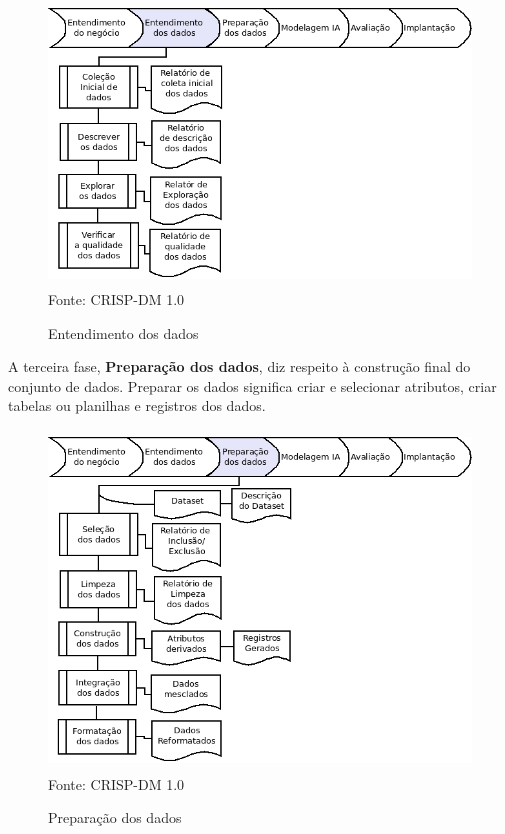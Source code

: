 \begin{figure}[!ht]
\centering
\caption{Entendimento dos dados}
\vspace{1mm}
\includegraphics[width=120mm, height=75mm]{Figuras/Cronograma/EntendDados.png}\\
\tiny Fonte: CRISP-DM 1.0
\end{figure}

\vspace{0.5cm}

A terceira fase, \textbf{Preparação dos dados}, diz respeito à construção final do conjunto de dados. 
Preparar os dados significa criar e selecionar atributos, criar tabelas ou planilhas e registros dos dados.

\pagebreak

\begin{figure}[!ht]
\centering
\caption{Preparação dos dados}
\vspace{1mm}
\includegraphics[width=120mm, height=90mm]{Figuras/Cronograma/PreparaDados.png}\\
\tiny Fonte: CRISP-DM 1.0
\end{figure}

